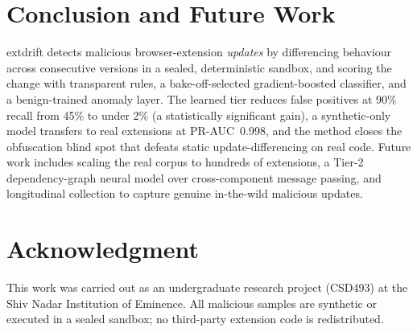 \documentclass[conference]{IEEEtran}
\begin{document}
\section{Conclusion and Future Work}
extdrift detects malicious browser-extension \emph{updates} by differencing behaviour across
consecutive versions in a sealed, deterministic sandbox, and scoring the change with transparent
rules, a bake-off-selected gradient-boosted classifier, and a benign-trained anomaly layer. The
learned tier reduces false positives at 90\% recall from 45\% to under 2\% (a statistically
significant gain), a synthetic-only model transfers to real extensions at PR-AUC~0.998, and the
method closes the obfuscation blind spot that defeats static update-differencing on real code.
Future work includes scaling the real corpus to hundreds of extensions, a Tier-2 dependency-graph
neural model over cross-component message passing, and longitudinal collection to capture genuine
in-the-wild malicious updates.

\section*{Acknowledgment}
This work was carried out as an undergraduate research project (CSD493) at the Shiv Nadar
Institution of Eminence. All malicious samples are synthetic or executed in a sealed sandbox; no
third-party extension code is redistributed.
\end{document}
